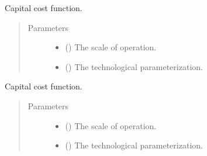 \documentclass[letterpaper,10pt,english]{sphinxmanual}
\begin{document}
\begin{fulllineitems}
\label{\detokenize{technology:technology.transport_model.capital_cost}}
Capital cost function.
\begin{quote}\begin{description}
\item[{Parameters}] \leavevmode\begin{itemize}
\item {} 
 () \textendash{} The scale of operation.

\item {} 
 () \textendash{} The technological parameterization.

\end{itemize}

\end{description}\end{quote}

\end{fulllineitems}


\begin{fulllineitems}
\label{\detokenize{technology:technology.transport_model.fixed_cost}}
Capital cost function.
\begin{quote}\begin{description}
\item[{Parameters}] \leavevmode\begin{itemize}
\item {} 
 () \textendash{} The scale of operation.

\item {} 
 () \textendash{} The technological parameterization.

\end{itemize}

\end{description}\end{quote}

\end{fulllineitems}
\end{document}
